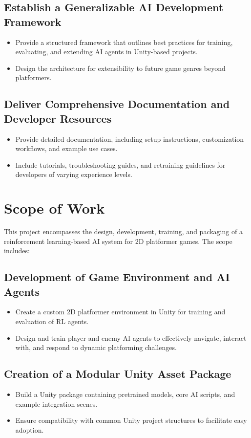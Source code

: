 \documentclass[12pt,oneside,openright,a4paper]{cpe-english-project}
\begin{document}
\subsection{Establish a Generalizable AI Development Framework}
\begin{itemize}
\item Provide a structured framework that outlines best practices for training, evaluating, and extending AI agents in Unity-based projects.
\item Design the architecture for extensibility to future game genres beyond platformers.
\end{itemize}
\subsection{Deliver Comprehensive Documentation and Developer Resources}
\begin{itemize}
\item Provide detailed documentation, including setup instructions, customization workflows, and example use cases.
\item Include tutorials, troubleshooting guides, and retraining guidelines for developers of varying experience levels.
\end{itemize}

\section{Scope of Work}
This project encompasses the design, development, training, and packaging of a reinforcement learning-based AI system for 2D platformer games. The scope includes:

\subsection{Development of Game Environment and AI Agents}
\begin{itemize}
\item Create a custom 2D platformer environment in Unity for training and evaluation of RL agents.
\item Design and train player and enemy AI agents to effectively navigate, interact with, and respond to dynamic platforming challenges.
\end{itemize}

\subsection{Creation of a Modular Unity Asset Package}
\begin{itemize}
\item Build a Unity package containing pretrained models, core AI scripts, and example integration scenes.
\item Ensure compatibility with common Unity project structures to facilitate easy adoption.
\end{itemize}
\end{document}
